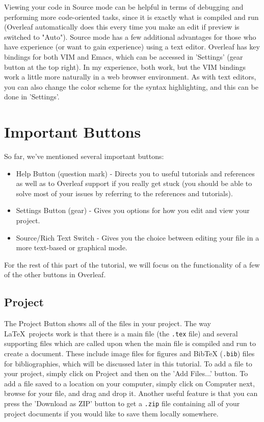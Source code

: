 \documentclass[english,12pt]{article}
\begin{document}
Viewing your code in Source mode can be helpful in terms of debugging and performing more code-oriented tasks, since it is exactly what is compiled and run (Overleaf automatically does this every time you make an edit if preview is switched to "Auto"). Source mode has a few additional advantages for those who have experience (or want to gain experience) using a text editor. Overleaf has key bindings for both VIM and Emacs, which can be accessed in 'Settings' (gear button at the top right). In my experience, both work, but the VIM bindings work a little more naturally in a web browser environment. As with text editors, you can also change the color scheme for the syntax highlighting, and this can be done in 'Settings'. 

\section*{Important Buttons}
So far, we've mentioned several important buttons: 

\begin{itemize}
\item Help Button (question mark) - Directs you to useful tutorials and references as well as to Overleaf support if you really get stuck (you should be able to solve most of your issues by referring to the references and tutorials).
\item Settings Button (gear) - Gives you options for how you edit and view your project.
\item Source/Rich Text Switch - Gives you the choice between editing your file in a more text-based or graphical mode.
\end{itemize}

\noindent For the rest of this part of the tutorial, we will focus on the functionality of a few of the other buttons in Overleaf.

\subsection*{Project}
The Project Button shows all of the files in your project. The way \LaTeX \ projects work is that there is a main file (the \texttt{.tex} file) and several supporting files which are called upon when the main file is compiled and run to create a document. These include image files for figures and BibTeX (\texttt{.bib}) files for bibliographies, which will be discussed later in this tutorial. To add a file to your project, simply click on Project and then on the 'Add Files...' button. To add a file saved to a location on your computer, simply click on Computer next, browse for your file, and drag and drop it. Another useful feature is that you can press the 'Download as ZIP' button to get a \texttt{.zip} file containing all of your project documents if you would like to save them locally somewhere.
\end{document}
